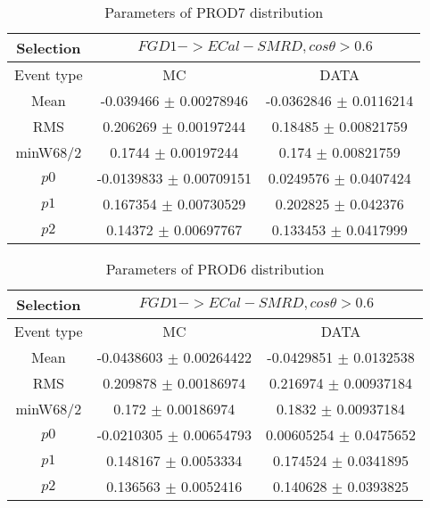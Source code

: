 \documentclass[a4paper,12pt]{article}
\begin{document}
\begin{table}[htbp]
\begin{center}
\begin{tabular}{|c|c|c|}
        \hline
        Selection & \multicolumn{2}{|c|}{$FGD1->ECal-SMRD, cos\theta>0.6$}  \\ \hline
        Event type & MC & DATA \\ 
        \hline
        Mean & -0.039466 $\pm$ 0.00278946 & -0.0362846 $\pm$ 0.0116214 \\ 
        \hline 
        RMS & 0.206269 $\pm$ 0.00197244 & 0.18485 $\pm$ 0.00821759 \\ 
        \hline 
        minW68/2 & 0.1744 $\pm$ 0.00197244 & 0.174 $\pm$ 0.00821759 \\ 
        \hline 
        $p0$ & -0.0139833 $\pm$ 0.00709151 & 0.0249576 $\pm$ 0.0407424 \\ 
        \hline 
        $p1$ & 0.167354 $\pm$ 0.00730529 & 0.202825 $\pm$ 0.042376 \\ 
        \hline 
        $p2$ & 0.14372 $\pm$ 0.00697767 & 0.133453 $\pm$ 0.0417999 \\ 
        \hline 
\end{tabular}
\caption{Parameters of PROD7 distribution } \vspace{0.2in}
\label{xxx}
\end{center}
\end{table}
\begin{table}[htbp]
\begin{center}
\begin{tabular}{|c|c|c|}
        \hline
        Selection & \multicolumn{2}{|c|}{$FGD1->ECal-SMRD, cos\theta>0.6$}  \\ \hline
        Event type & MC & DATA \\ 
        \hline
        Mean & -0.0438603 $\pm$ 0.00264422 & -0.0429851 $\pm$ 0.0132538 \\ 
        \hline 
        RMS & 0.209878 $\pm$ 0.00186974 & 0.216974 $\pm$ 0.00937184 \\ 
        \hline 
        minW68/2 & 0.172 $\pm$ 0.00186974 & 0.1832 $\pm$ 0.00937184 \\ 
        \hline 
        $p0$ & -0.0210305 $\pm$ 0.00654793 & 0.00605254 $\pm$ 0.0475652 \\ 
        \hline 
        $p1$ & 0.148167 $\pm$ 0.0053334 & 0.174524 $\pm$ 0.0341895 \\ 
        \hline 
        $p2$ & 0.136563 $\pm$ 0.0052416 & 0.140628 $\pm$ 0.0393825 \\ 
        \hline 
\end{tabular}
\caption{Parameters of PROD6 distribution } \vspace{0.2in}
\label{xxx}
\end{center}
\end{table}
\end{document}
